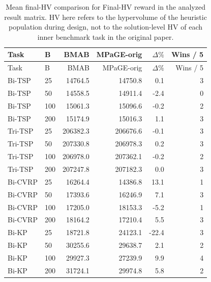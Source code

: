 \begin{longtable}{llrrrr}
\caption[Mean final-HV comparison]{Mean final-HV comparison for Final-HV reward in the analyzed result matrix. HV here refers to the hypervolume of the heuristic population during design, not to the solution-level HV of each inner benchmark task in the original paper.}
\label{tab:hv-results}\\
\toprule
Task & B & BMAB & MPaGE-orig & $\Delta\%$ & Wins / 5 \\
\midrule
\endfirsthead
\toprule
Task & B & BMAB & MPaGE-orig & $\Delta\%$ & Wins / 5 \\
\midrule
\endhead
Bi-TSP & 25 & 14764.5 & 14750.8 & 0.1 & 3 \\
Bi-TSP & 50 & 14558.5 & 14911.4 & -2.4 & 0 \\
Bi-TSP & 100 & 15061.3 & 15096.6 & -0.2 & 2 \\
Bi-TSP & 200 & 15174.9 & 15016.3 & 1.1 & 3 \\
Tri-TSP & 25 & 206382.3 & 206676.6 & -0.1 & 3 \\
Tri-TSP & 50 & 207330.8 & 206978.3 & 0.2 & 3 \\
Tri-TSP & 100 & 206978.0 & 207362.1 & -0.2 & 2 \\
Tri-TSP & 200 & 207247.8 & 207182.3 & 0.0 & 3 \\
Bi-CVRP & 25 & 16264.4 & 14386.8 & 13.1 & 1 \\
Bi-CVRP & 50 & 17393.6 & 16246.9 & 7.1 & 3 \\
Bi-CVRP & 100 & 17205.0 & 18153.3 & -5.2 & 1 \\
Bi-CVRP & 200 & 18164.2 & 17210.4 & 5.5 & 3 \\
Bi-KP & 25 & 18721.8 & 24123.1 & -22.4 & 3 \\
Bi-KP & 50 & 30255.6 & 29638.7 & 2.1 & 2 \\
Bi-KP & 100 & 29927.3 & 27239.9 & 9.9 & 4 \\
Bi-KP & 200 & 31724.1 & 29974.8 & 5.8 & 2 \\
\bottomrule
\end{longtable}
